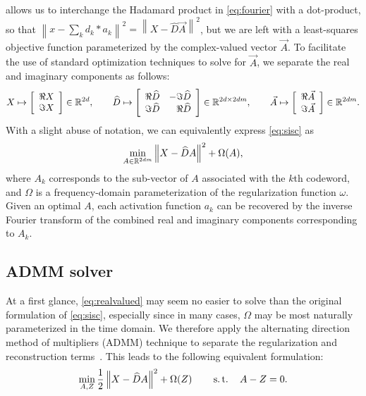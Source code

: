 \documentclass{article} %
\begin{document}
 allows us to interchange the Hadamard product in
\eqref{eq:fourier} with a dot-product, so that 
$\left\|x - \sum_k d_k * a_k\right\|^2 =  \left\|X - \widehat{D}\vec{A}\right\|^2$,
but we are left with a least-squares objective function parameterized by the complex-valued 
vector $\vec{A}$. To facilitate the use of standard optimization techniques to solve for
$\vec{A}$, we separate the real and imaginary components as follows:
\begin{equation}
X \mapsto \left[\begin{array}{r}\Re X \\ \Im X\end{array}\right] \in \mathbb{R}^{2d},
\quad\quad \widehat{D} \mapsto \left[\begin{array}{rr}\Re \widehat{D} & - \Im \widehat{D}\\
\Im \widehat{D} & \Re \widehat{D}\end{array}\right] \in \mathbb{R}^{2d\times 2dm},
\quad\quad \vec{A} \mapsto \left[\begin{array}{r}\Re \vec{A} \\ \Im \vec{A}\end{array}\right]
\in \mathbb{R}^{2dm}.\label{eq:realized}
\end{equation}
With a slight abuse of notation, we can equivalently express \eqref{eq:sisc} as
\begin{equation}
\min_{A \in \mathbb{R}^{2dm}} \left\|X - \widehat{D}A\right\|^2 + \Omega(A),\label{eq:realvalued}
\end{equation}
where $A_k$ corresponds to the sub-vector of $A$ associated with the $k$th codeword, and 
$\Omega$ is a frequency-domain parameterization of the regularization function $\omega$.
Given an optimal $A$, each activation function $a_k$ can be 
recovered by the inverse Fourier transform of the combined real and imaginary components
corresponding to $A_k$.

\subsection{ADMM solver}
\label{sec:solver}
At a first glance, \eqref{eq:realvalued} may seem no easier to solve than the original
formulation of \eqref{eq:sisc}, especially since in many cases, $\Omega$ may be most
naturally parameterized in the time domain.  We therefore apply the alternating
direction method of multipliers (ADMM) technique to separate the regularization and
reconstruction terms~\cite{boyd2011}.  This leads to the following equivalent
formulation:
\begin{equation}
\min_{A, Z} \frac{1}{2}\left\|X - \widehat{D}A\right\|^2 + \Omega(Z)
\quad\quad \operatorname{s.t.}\quad A - Z = 0.\label{eq:admm}
\end{equation}
\end{document}
